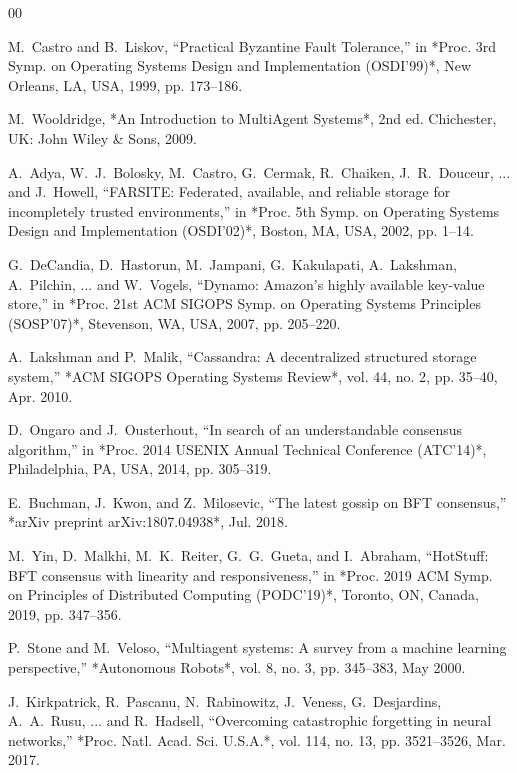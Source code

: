 \documentclass[conference]{IEEEtran}
\begin{document}

\begin{thebibliography}{00}

M.~Castro and B.~Liskov, “Practical Byzantine Fault Tolerance,” in *Proc. 3rd Symp. on Operating Systems Design and Implementation (OSDI’99)*, New Orleans, LA, USA, 1999, pp. 173–186.

M.~Wooldridge, *An Introduction to MultiAgent Systems*, 2nd ed. Chichester, UK: John Wiley \& Sons, 2009.

A.~Adya, W.~J.~Bolosky, M.~Castro, G.~Cermak, R.~Chaiken, J.~R.~Douceur, ... and J.~Howell, “FARSITE: Federated, available, and reliable storage for incompletely trusted environments,” in *Proc. 5th Symp. on Operating Systems Design and Implementation (OSDI’02)*, Boston, MA, USA, 2002, pp. 1–14.

G.~DeCandia, D.~Hastorun, M.~Jampani, G.~Kakulapati, A.~Lakshman, A.~Pilchin, ... and W.~Vogels, “Dynamo: Amazon’s highly available key-value store,” in *Proc. 21st ACM SIGOPS Symp. on Operating Systems Principles (SOSP’07)*, Stevenson, WA, USA, 2007, pp. 205–220.

A.~Lakshman and P.~Malik, “Cassandra: A decentralized structured storage system,” *ACM SIGOPS Operating Systems Review*, vol. 44, no. 2, pp. 35–40, Apr. 2010.

D.~Ongaro and J.~Ousterhout, “In search of an understandable consensus algorithm,” in *Proc. 2014 USENIX Annual Technical Conference (ATC’14)*, Philadelphia, PA, USA, 2014, pp. 305–319.

E.~Buchman, J.~Kwon, and Z.~Milosevic, “The latest gossip on BFT consensus,” *arXiv preprint arXiv:1807.04938*, Jul. 2018.

M.~Yin, D.~Malkhi, M.~K.~Reiter, G.~G.~Gueta, and I.~Abraham, “HotStuff: BFT consensus with linearity and responsiveness,” in *Proc. 2019 ACM Symp. on Principles of Distributed Computing (PODC’19)*, Toronto, ON, Canada, 2019, pp. 347–356.

P.~Stone and M.~Veloso, “Multiagent systems: A survey from a machine learning perspective,” *Autonomous Robots*, vol. 8, no. 3, pp. 345–383, May 2000.

J.~Kirkpatrick, R.~Pascanu, N.~Rabinowitz, J.~Veness, G.~Desjardins, A.~A.~Rusu, ... and R.~Hadsell, “Overcoming catastrophic forgetting in neural networks,” *Proc. Natl. Acad. Sci. U.S.A.*, vol. 114, no. 13, pp. 3521–3526, Mar. 2017.


\end{thebibliography}
\end{document}
